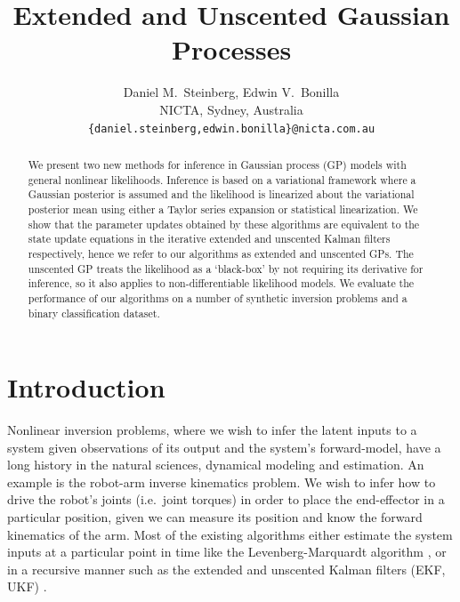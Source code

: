 \documentclass{article} %
\title{Extended and Unscented Gaussian Processes}
\author{
    Daniel M.~Steinberg, Edwin V.~Bonilla \\
    NICTA, 
    Sydney, Australia\\
    \texttt{\{daniel.steinberg,edwin.bonilla\}@nicta.com.au}
}
\begin{document}
\maketitle

\begin{abstract}

    We present two new methods for inference in Gaussian process (GP) models
    with general nonlinear likelihoods. Inference is based on a variational
    framework where a Gaussian posterior is assumed and the likelihood is
    linearized about the variational posterior mean using either a %
    Taylor series expansion or statistical linearization. We show that the
    parameter updates obtained by these algorithms are equivalent to the state
    update equations in the iterative extended and unscented Kalman filters
    respectively, hence we refer to our algorithms as extended and unscented
    GPs. The unscented GP treats the likelihood as a `black-box' by not
    requiring its derivative for inference, so it also applies to
    non-differentiable likelihood models. We evaluate the performance of our
    algorithms on a  number of synthetic inversion problems and a binary
    classification dataset.
    
\end{abstract}


\section{Introduction}

Nonlinear inversion problems, where we wish to infer the latent inputs to a
system given observations of its output and the system's forward-model, have a
long history in the natural sciences, dynamical modeling and estimation. An
example is the robot-arm inverse kinematics problem. We wish to infer how to
drive the robot's joints (i.e.~joint torques) in order to place the
end-effector in a particular position, given we can measure its position and
know the forward kinematics of the arm. Most of the existing algorithms either
estimate the system inputs at a particular point in time like the
Levenberg-Marquardt algorithm \cite{Marquardt1963}, or in a recursive manner
such as the extended and unscented Kalman filters (EKF, UKF) \cite{Julier2004}. 
\end{document}
